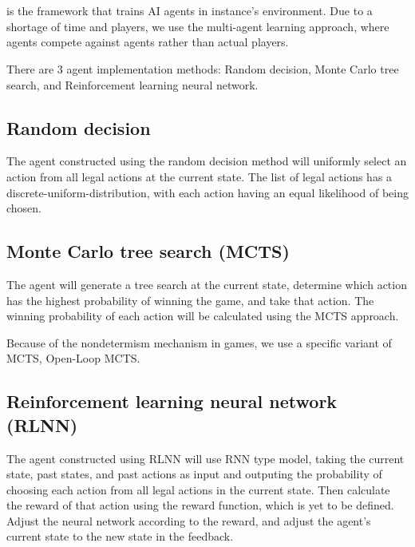 \section{\RootAI}
\RootAI{} is the framework that trains AI agents in \RootOurs{} instance’s environment. Due to a shortage of time and players, we use the multi-agent learning approach, where agents compete against agents rather than actual players.

There are 3 agent implementation methods: Random decision, Monte Carlo tree search, and Reinforcement learning neural network.

\subsection{Random decision}
The agent constructed using the random decision method will uniformly select an action from all legal actions at the current state. The list of legal actions has a \gls{discrete-uniform-distribution}, with each action having an equal likelihood of being chosen. %


\subsection{Monte Carlo tree search (MCTS)} %
The agent will generate a tree search at the current state, determine which action has the highest probability of winning the game, and take that action. The winning probability of each action will be calculated using the MCTS approach. 

Because of the nondetermism mechanism in games, we use a specific variant of MCTS, Open-Loop MCTS.

\subsection{Reinforcement learning neural network (RLNN)} %
The agent constructed using RLNN will use RNN type model, taking the current state, past states, and past actions as input and outputing the probability of choosing each action from all legal actions in the current state. Then calculate the reward of that action using the reward function, which is yet to be defined. Adjust the neural network according to the reward, and adjust the agent’s current state to the new state in the feedback. %



